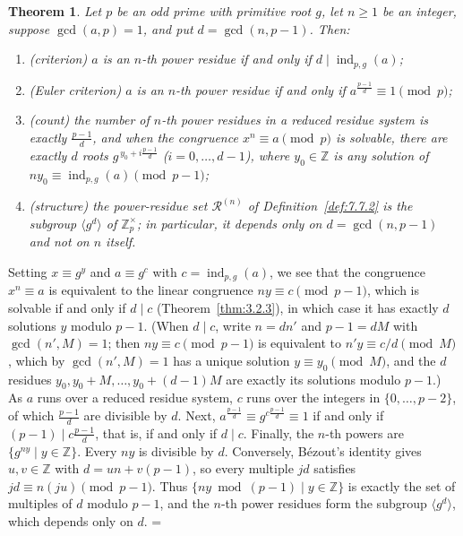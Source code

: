 \documentclass[11pt]{article}
\makeatletter
\let\nt@closedisplay\]
\def\nt@guardedclose{\@ifnextchar\par{\nt@closeafterpar}{\@ifnextchar\end{\postdisplaypenalty\@M\nt@closedisplay}{\nt@closedisplay}}}
\def\nt@closeafterpar\par{\@ifnextchar\par{\nt@closeafterpar}{\@ifnextchar\end{\postdisplaypenalty\@M\nt@closedisplay\par}{\nt@closedisplay\par}}}
\renewenvironment{proof}[1][\proofname]{\par
  \pushQED{\qed}\normalfont\topsep\medskipamount\edef\nt@afterproof{\@endparpenalty=\the\@endparpenalty\relax}\@beginparpenalty\@M\@endparpenalty\@M\let\]\nt@guardedclose\trivlist\item[]\textit{#1\@addpunct{.}} \ignorespaces}{\ifvmode\addpenalty\@M\fi\popQED\nt@afterproof\endtrivlist\@endpefalse}
\theoremstyle{ntstyle}
\newtheorem{theorem}{Theorem}[subsection]
\newcommand{\ZmodUnits}[1]{\mathbb{Z}_{#1}^{\times}}
\DeclareMathOperator{\ind}{ind}
\makeatother
\begin{document}
\begin{theorem}\label{thm:7.7.1} Let $p$ be an odd
  prime with primitive root $g$, let $n\ge1$ be an integer, suppose
  $\gcd(a, p) = 1$, and put $d = \gcd(n, p-1)$. Then:

  \begin{enumerate}[label={\alph*)}]
    \item (criterion) $a$ is an $n$-th power residue if and only if $d \mid \ind_{p,g}(a)$;
    \item (Euler criterion) $a$ is an $n$-th power residue if and only if
            $a^{\frac{p-1}{d}} \equiv 1 \pmod{p}$;
    \item (count) the number of $n$-th power residues in a reduced residue system is exactly
          $\tfrac{p-1}{d}$, and when the congruence $x^{n} \equiv a \pmod{p}$ is solvable, there are
          exactly $d$ roots $g^{\,y_0 + i\frac{p-1}{d}}$ ($i = 0, \ldots, d-1$),
          where $y_0\in\mathbb{Z}$ is any solution of
          $ny_0\equiv\ind_{p,g}(a)\pmod{p-1}$;
    \item (structure) the power-residue set $\mathcal{R}^{(n)}$ of
          Definition~\ref{def:7.7.2} is the subgroup $\langle g^{d}\rangle$ of
          $\ZmodUnits{p}$; in
          particular, it depends only on $d = \gcd(n, p-1)$ and not on $n$ itself.
  \end{enumerate}

\end{theorem}

\begin{proof}
  Setting $x \equiv g^{y}$ and $a \equiv g^{c}$ with $c = \ind_{p,g}(a)$, we see that the congruence
  $x^{n} \equiv a$ is equivalent to the linear congruence $ny \equiv c \pmod{p-1}$, which is solvable if and only
  if $d \mid c$ (Theorem~\ref{thm:3.2.3}), in which case it has exactly $d$ solutions $y$ modulo $p-1$. (When
  $d \mid c$, write
    $n = d n'$ and $p - 1 = d M$ with $\gcd(n', M) = 1$; then $ny \equiv c \pmod{p-1}$ is equivalent to
    $n' y \equiv c/d \pmod{M}$, which by
  $\gcd(n', M) = 1$ has a unique solution $y \equiv y_0 \pmod{M}$, and
  the $d$ residues $y_0, y_0 + M, \ldots, y_0 + (d-1)M$ are
  exactly its solutions modulo $p-1$.) As $a$ runs over a reduced
  residue system, $c$ runs over the integers in $\{0, \ldots, p-2\}$, of which
  $\tfrac{p-1}{d}$ are divisible by $d$. Next, $a^{\frac{p-1}{d}} \equiv g^{c\frac{p-1}{d}} \equiv 1$ if and only
  if $(p-1) \mid c\tfrac{p-1}{d}$,
    that is, if and only if $d \mid c$. Finally, the $n$-th powers are
  $\{g^{ny} \mid y \in \mathbb{Z}\}$. Every $ny$ is divisible by $d$.
  Conversely, Bézout's identity gives $u,v\in\mathbb{Z}$ with
  $d=un+v(p-1)$, so every multiple $jd$ satisfies
  $jd\equiv n(ju)\pmod{p-1}$. Thus $\{ny\bmod(p-1) \mid y\in\mathbb{Z}\}$
  is exactly the set of multiples of $d$ modulo $p-1$, and the $n$-th
  power residues form the subgroup $\langle g^{d}\rangle$, which depends
  only on $d$.
\end{proof}
\end{document}
